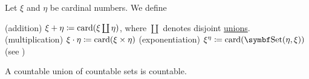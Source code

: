 \begin{definition}\label{def:cardinal_arithmetic}
  Let \( \xi \) and \( \eta \) be cardinal numbers. We define
  \begin{thmenum}
    (addition) \( \xi + \eta \coloneqq \operatorname{card}(\xi \coprod \eta) \), where \( \coprod \) denotes disjoint \hyperref[def:disjoint_union]{unions}.
    (multiplication) \( \xi \cdot \eta \coloneqq \operatorname{card}(\xi \times \eta) \)
    (exponentiation) \( \xi^\eta \coloneqq \card(\cat{Set}(\eta, \xi)) \) (see )
  \end{thmenum}
\end{definition}

\begin{proposition}\label{thm:countable_union_of_countable_sets}\mcite\cite[thm. 6Q]{Enderton1977Sets}
  A countable union of countable sets is countable.
\end{proposition}
